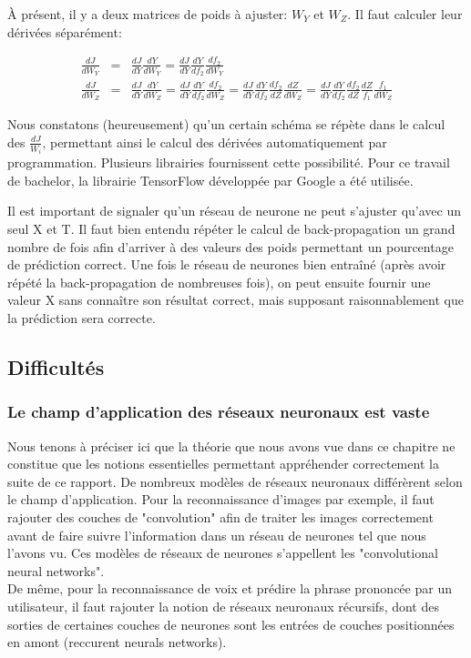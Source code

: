 \documentclass[11pt,a4paper]{report}
\begin{document}
    \par À présent, il y a deux matrices de poids à ajuster: $W_Y$ et $W_Z$. Il faut calculer leur dérivées séparément: 
    
    \begin{eqnarray}
    \frac{dJ}{dW_Y} &=& \frac{dJ}{dY} \frac{dY}{dW_Y} = \frac{dJ}{dY} \frac{dY}{df_2}\frac{df_2}{dW_Y} \\
    \frac{dJ}{dW_Z} &=& \frac{dJ}{dY} \frac{dY}{dW_Z} = \frac{dJ}{dY} \frac{dY}{df_2}\frac{df_2}{dW_Z} = \frac{dJ}{dY} \frac{dY}{df_2}\frac{df_2}{dZ}\frac{dZ}{dW_Z} = \frac{dJ}{dY} \frac{dY}{df_2}\frac{df_2}{dZ} \frac{dZ}{f_1}\frac{f_1}{dW_Z} 
    \end{eqnarray}

    \par Nous constatons (heureusement) qu'un certain schéma se répète dans le calcul des $\frac{dJ}{W_i}$, permettant ainsi le calcul des dérivées automatiquement par programmation. Plusieurs librairies fournissent cette possibilité. Pour ce travail de bachelor, la librairie TensorFlow développée par Google a été utilisée. 
    
    \par Il est important de signaler qu'un réseau de neurone ne peut s'ajuster qu'avec un seul X et T. Il faut bien entendu répéter le calcul de back-propagation un grand nombre de fois afin d'arriver à des valeurs des poids permettant un pourcentage de prédiction correct. Une fois le réseau de neurones bien entraîné (après avoir répété la back-propagation de nombreuses fois), on peut ensuite fournir une valeur X sans connaître son résultat correct, mais supposant raisonnablement que la prédiction sera correcte. 
    
  \subsection{Difficultés}
  
  \subsubsection{Le champ d'application des réseaux neuronaux est vaste}
  
    \par Nous tenons à préciser ici que la théorie que nous avons vue dans ce chapitre ne constitue que les notions essentielles permettant appréhender correctement la suite de ce rapport. De nombreux modèles de réseaux neuronaux différèrent selon le champ d'application. Pour la reconnaissance d'images par exemple, il faut rajouter des couches de "convolution" afin de traiter les images correctement avant de faire suivre l'information dans un réseau de neurones tel que nous l'avons vu. Ces modèles de réseaux de neurones s'appellent les "convolutional neural networks". \\
    De même, pour la reconnaissance de voix et prédire la phrase prononcée par un utilisateur, il faut rajouter la notion de réseaux neuronaux récursifs, dont des sorties de certaines couches de neurones sont les entrées de couches positionnées en amont (reccurent neurals networks). 
  
\end{document}
